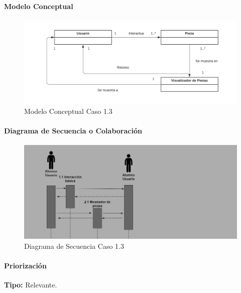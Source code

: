 \paragraph{Modelo Conceptual}

\begin{figure}[H]
\centerline{\includegraphics[width=15cm]{imgs/ModeloConceptualCaso_3_3.png}}
\caption{Modelo Conceptual Caso 1.3}
\label{fig_3_2}
\end{figure}


\paragraph{Diagrama de Secuencia o Colaboración}

\begin{figure}[H]
\centerline{\includegraphics[width=15cm]{imgs/CasoUso_3_2.PNG}}
\caption{Diagrama de Secuencia Caso 1.3}
\label{fig_3_3}
\end{figure}

\paragraph{Priorización}
{\textbf {Tipo:}}
Relevante.